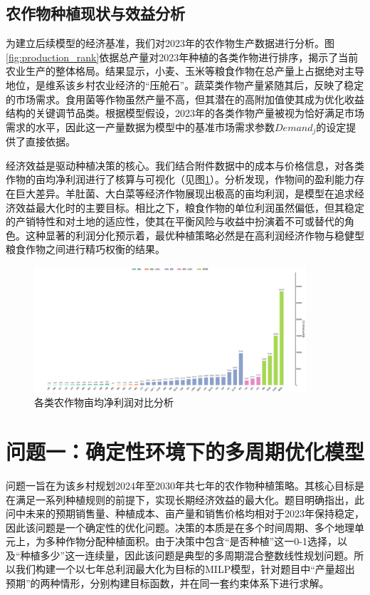 \documentclass[withoutpreface,bwprint]{cumcmthesis} %
\begin{document}
\subsection{农作物种植现状与效益分析}

为建立后续模型的经济基准，我们对2023年的农作物生产数据进行分析。图\ref{fig:production_rank}依据总产量对2023年种植的各类作物进行排序，揭示了当前农业生产的整体格局。结果显示，小麦、玉米等粮食作物在总产量上占据绝对主导地位，是维系该乡村农业经济的“压舱石”。蔬菜类作物产量紧随其后，反映了稳定的市场需求。食用菌等作物虽然产量不高，但其潜在的高附加值使其成为优化收益结构的关键调节品类。根据模型假设，2023年的各类作物产量被视为恰好满足市场需求的水平，因此这一产量数据为模型中的基准市场需求参数$Demand_j$的设定提供了直接依据。



经济效益是驱动种植决策的核心。我们结合附件数据中的成本与价格信息，对各类作物的亩均净利润进行了核算与可视化（见图\ref{fig:profit_per_mu}）。分析发现，作物间的盈利能力存在巨大差异。羊肚菌、大白菜等经济作物展现出极高的亩均利润，是模型在追求经济效益最大化时的主要目标。相比之下，粮食作物的单位利润虽然偏低，但其稳定的产销特性和对土地的适应性，使其在平衡风险与收益中扮演着不可或替代的角色。这种显著的利润分化预示着，最优种植策略必然是在高利润经济作物与稳健型粮食作物之间进行精巧权衡的结果。

\begin{figure}[htbp]
    \centering
    \includegraphics[width=0.9\textwidth]{figures/0_3.png}
    \caption{各类农作物亩均净利润对比分析}
    \label{fig:profit_per_mu}
\end{figure}



\section{问题一：确定性环境下的多周期优化模型}

问题一旨在为该乡村规划2024年至2030年共七年的农作物种植策略。其核心目标是在满足一系列种植规则的前提下，实现长期经济效益的最大化。题目明确指出，此问中未来的预期销售量、种植成本、亩产量和销售价格均相对于2023年保持稳定，因此该问题是一个确定性的优化问题。决策的本质是在多个时间周期、多个地理单元上，为多种作物分配种植面积。由于决策中包含“是否种植”这一0-1选择，以及“种植多少”这一连续量，因此该问题是典型的多周期混合整数线性规划问题。所以我们构建一个以七年总利润最大化为目标的MILP模型，针对题目中“产量超出预期”的两种情形，分别构建目标函数，并在同一套约束体系下进行求解。
\end{document}
